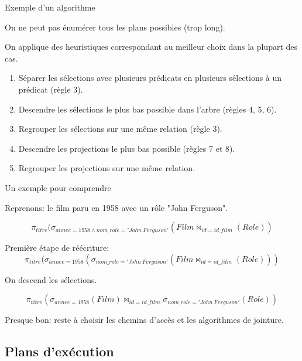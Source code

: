 \begin{frame}{Exemple d'un algorithme}

On ne peut pas \alert{énumérer} tous les plans possibles (trop long).

\vfill

On applique des heuristiques correspondant au meilleur choix dans la plupart des cas.

\vfill


\begin{enumerate}
\item Séparer les sélections avec plusieurs prédicats
en plusieurs sélections \`a un prédicat (règle 3).
\item Descendre les sélections le plus bas possible dans l'arbre 
(règles 4, 5, 6).
\item Regrouper les sélections sur une même relation 
(règle 3).
\item Descendre les projections le plus bas possible (règles
7 et 8).
\item Regrouper les projections sur une même relation.
\end{enumerate}

\end{frame}


\begin{frame}{Un exemple pour comprendre}

Reprenons: le film
paru en 1958 avec un rôle "John Ferguson".

\vfill

 $$\pi_{titre}(\sigma_{annee=1958 \land nom\_role='John\ Ferguson'}(Film \Join_{id=id\_film} (Role) )$$

\vfill

Première étape de réécriture:
\[
    \pi_{titre}(\sigma_{annee=1958} ( \sigma_{nom\_role='John\ Ferguson'}(Film \Join_{id=id\_film} (Role) ))
\]
\vfill

On descend les sélections.

\[
    \pi_{titre}( \sigma_{annee=1958} (Film) \Join_{id=id\_film} \sigma_{nom\_role='John\ Ferguson'}(Role) )
\]

\vfill


Presque bon: reste à choisir les chemins d'accès et les algorithmes de jointure.

\end{frame}

\subsection{Plans d'exécution}


